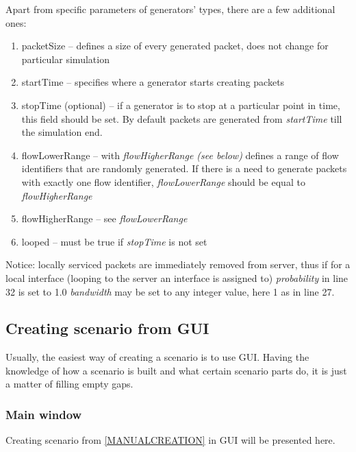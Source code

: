 \documentclass[a4paper,12pt]{article}
\begin{document}
    Apart from specific parameters of generators' types, there are a few
    additional ones:
    
    \begin{enumerate}
      \item packetSize -- defines a size of every generated packet, does not
      change for particular simulation
      \item startTime -- specifies where a generator starts creating packets
      \item stopTime (optional) -- if a generator is to stop at a particular
      point in time, this field should be set. By default packets are generated
      from \emph{startTime} till the simulation end.
      \item flowLowerRange -- with \emph{flowHigherRange (see below)} defines a
      range of flow identifiers that are randomly generated. If there is a need
      to generate packets with exactly one flow identifier,
      \emph{flowLowerRange} should be equal to \emph{flowHigherRange}
      \item flowHigherRange -- see \emph{flowLowerRange}
      \item looped -- must be true if \emph{stopTime} is not set 
    \end{enumerate}
    Notice: locally serviced packets are immediately removed from server, thus
    if for a local interface (looping to the server an interface is assigned to)
    \emph{probability} in line 32 is set to 1.0 \emph{bandwidth} may be set to
    any integer value, here 1 as in line 27.
    
	\subsection{Creating scenario from GUI}
	Usually, the easiest way of creating a scenario is to use GUI. Having the
	knowledge of how a scenario is built and what certain scenario parts do, it
	is just a matter of filling empty gaps.
	
	\subsubsection{Main window}
		Creating scenario from \ref{MANUALCREATION} in GUI will be presented here.
		
\end{document}
